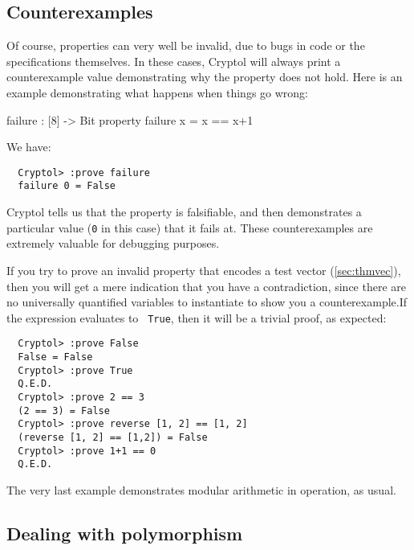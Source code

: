 \subsection{Counterexamples}
\label{sec:counterexamples}

Of course, properties can very well be invalid, due to bugs in code or
the specifications themselves. In these cases, Cryptol will always
print a counterexample value demonstrating why the property does not
hold. Here is an example demonstrating what happens when things go
wrong:
\begin{code}
  failure : [8] -> Bit
  property failure x = x == x+1
\end{code}
We have:
\begin{Verbatim}
  Cryptol> :prove failure
  failure 0 = False
\end{Verbatim}
Cryptol tells us that the property is falsifiable, and then
demonstrates a particular value ({\tt 0} in this case) that it fails
at. These counterexamples are extremely valuable for debugging
purposes.\indCounterExample

If you try to prove an invalid property that encodes a test vector
(\autoref{sec:thmvec}), then you will get a mere indication that
you have a contradiction, since there are no universally quantified
variables to instantiate to show you a
counterexample.\indContradiction  If the expression evaluates to {\tt
  True}, then it will be a trivial proof, as expected:
\begin{Verbatim}
  Cryptol> :prove False
  False = False
  Cryptol> :prove True
  Q.E.D.
  Cryptol> :prove 2 == 3
  (2 == 3) = False
  Cryptol> :prove reverse [1, 2] == [1, 2]
  (reverse [1, 2] == [1,2]) = False
  Cryptol> :prove 1+1 == 0
  Q.E.D.
\end{Verbatim}
The very last example demonstrates modular arithmetic in operation, as
usual.\indModular

\subsection{Dealing with polymorphism}
\label{sec:deal-with-polym}

